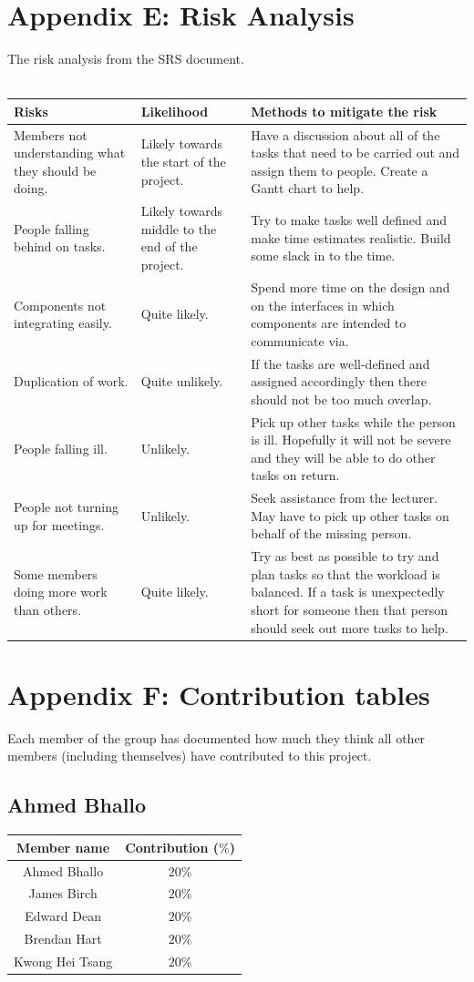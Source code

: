 \documentclass[12pt]{article}
\newcommand{\return}{\\\\\noindent}
\begin{document}
\section{Appendix E: Risk Analysis}
The risk analysis from the SRS document.\return
\begin{tabularx}{\textwidth}{|p{4cm}|p{3cm}|X|} \hline
Risks & Likelihood & Methods to mitigate the risk \\ \hline
Members not understanding what they should be doing. & Likely towards the start of the project. & Have a discussion about all of the tasks that need to be carried out and assign them to people. Create a Gantt chart to help.\\ \hline
People falling behind on tasks. & Likely towards middle to the end of the project. & Try to make tasks well defined and make time estimates realistic. Build some slack in to the time.\\ \hline
Components not integrating easily. & Quite likely. & Spend more time on the design and on the interfaces in which components are intended to communicate via.\\ \hline
Duplication of work. & Quite unlikely. & If the tasks are well-defined and assigned accordingly then there should not be too much overlap.\\ \hline
People falling ill. & Unlikely. & Pick up other tasks while the person is ill. Hopefully it will not be severe and they will be able to do other tasks on return.\\ \hline
People not turning up for meetings. & Unlikely. & Seek assistance from the lecturer. May have to pick up other tasks on behalf of the missing person.\\ \hline
Some members doing more work than others. & Quite likely. & Try as best as possible to try and plan tasks so that the workload is balanced. If a task is unexpectedly short for someone then that person should seek out more tasks to help.\\ \hline
\end{tabularx}
\newpage
\section{Appendix F: Contribution tables}
Each member of the group has documented how much they think all other members (including themselves) have contributed to this project.
\subsection{Ahmed Bhallo}
\begin{tabular}{|c|c|} \hline
\textbf{Member name} & \textbf{Contribution ($\%$)}\\ \hline
Ahmed Bhallo & $20\%$ \\ \hline
James Birch & $20\%$ \\ \hline
Edward Dean & $20\%$ \\ \hline
Brendan Hart & $20\%$ \\ \hline
Kwong Hei Tsang & $20\%$ \\ \hline
\end{tabular}
\end{document}

